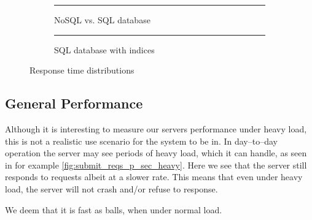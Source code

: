 \begin{figure}[!htb]
    \centering
    \begin{subfigure}[b]{0.5\textwidth}
        \centering
        \rule{5cm}{5cm}
        \caption{NoSQL vs. SQL database}\label{fig:same_response_sql}
    \end{subfigure}\hfill%
    \begin{subfigure}[b]{0.5\textwidth}
        \centering
        \rule{5cm}{5cm}
        \caption{SQL database with indices}\label{fig:fast_response_indices}
    \end{subfigure}
    \caption{Response time distributions}\label{fig:nosql_vs_sql}
\end{figure}

\subsection{General Performance}
Although it is interesting to measure our servers performance under heavy load, this is not a realistic use scenario for the system to be in.
In day--to--day operation the server may see periods of heavy load, which it can handle, as seen in for example \cref{fig:submit_reqs_p_sec_heavy}.
Here we see that the server still responds to requests albeit at a slower rate.
This means that even under heavy load, the server will not crash and/or refuse to response.

We deem that it is fast as balls, when under normal load.

